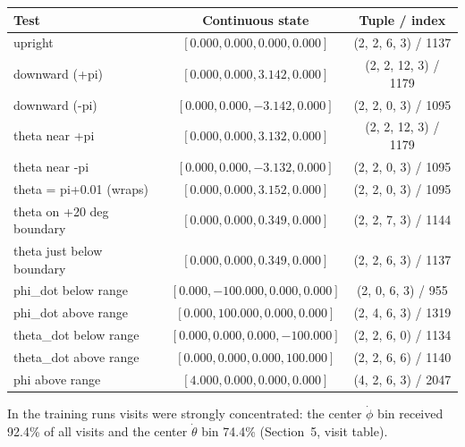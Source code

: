 \documentclass[11pt]{article}
\newcommand{\phidotCenter}{92.4}
\newcommand{\thdotCenter}{74.4}
\begin{document}
\begin{center}\small\begin{tabular}{lcc}
\toprule
Test & Continuous state & Tuple / index \\
\midrule
upright & $[0.000, 0.000, 0.000, 0.000]$ & (2, 2, 6, 3) / 1137 \\
downward (+pi) & $[0.000, 0.000, 3.142, 0.000]$ & (2, 2, 12, 3) / 1179 \\
downward (-pi) & $[0.000, 0.000, -3.142, 0.000]$ & (2, 2, 0, 3) / 1095 \\
theta near +pi & $[0.000, 0.000, 3.132, 0.000]$ & (2, 2, 12, 3) / 1179 \\
theta near -pi & $[0.000, 0.000, -3.132, 0.000]$ & (2, 2, 0, 3) / 1095 \\
theta = pi+0.01 (wraps) & $[0.000, 0.000, 3.152, 0.000]$ & (2, 2, 0, 3) / 1095 \\
theta on +20 deg boundary & $[0.000, 0.000, 0.349, 0.000]$ & (2, 2, 7, 3) / 1144 \\
theta just below boundary & $[0.000, 0.000, 0.349, 0.000]$ & (2, 2, 6, 3) / 1137 \\
phi\_dot below range & $[0.000, -100.000, 0.000, 0.000]$ & (2, 0, 6, 3) / 955 \\
phi\_dot above range & $[0.000, 100.000, 0.000, 0.000]$ & (2, 4, 6, 3) / 1319 \\
theta\_dot below range & $[0.000, 0.000, 0.000, -100.000]$ & (2, 2, 6, 0) / 1134 \\
theta\_dot above range & $[0.000, 0.000, 0.000, 100.000]$ & (2, 2, 6, 6) / 1140 \\
phi above range & $[4.000, 0.000, 0.000, 0.000]$ & (4, 2, 6, 3) / 2047 \\
\bottomrule
\end{tabular}\end{center}
In the training runs visits were strongly concentrated: the center $\dot\phi$ bin received \phidotCenter\% of all visits and the center $\dot\theta$ bin \thdotCenter\% (Section~5, visit table).
\end{document}
